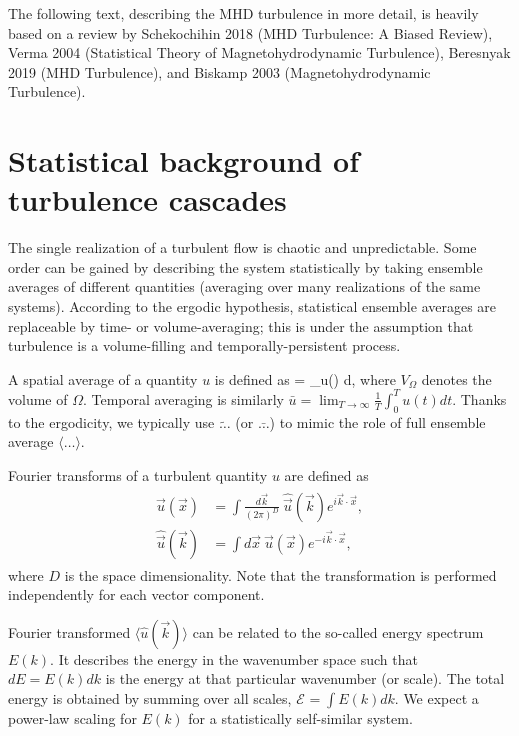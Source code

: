 \documentclass[usenatbib,twocolumn, twocolappendix]{aastex63}
\newcommand{\ene}[2]{\mathcal{E}_{#1}^{#2}} %
\begin{document}
The following text, describing the MHD turbulence in more detail, is heavily based on a review by Schekochihin 2018 (MHD Turbulence: A Biased Review), Verma 2004 (Statistical Theory of Magnetohydrodynamic Turbulence), Beresnyak 2019 (MHD Turbulence), and Biskamp 2003 (Magnetohydrodynamic Turbulence).




\section{Statistical background of turbulence cascades}\label{sect:turb}

The single realization of a turbulent flow is chaotic and unpredictable.
Some order can be gained by describing the system statistically by taking ensemble averages of different quantities (averaging over many realizations of the same systems).
According to the ergodic hypothesis, statistical ensemble averages are replaceable by time- or volume-averaging;
this is under the assumption that turbulence is a volume-filling and temporally-persistent process.

A spatial average of a quantity $u$ is defined as
\be
{} =  \int_\Omega u() d,
\ee
where $V_\Omega$ denotes the volume of $\Omega$.
Temporal averaging is similarly $\bar{u} = \lim_{T\rightarrow\infty} \frac{1}{T} \int_0^T u(t) dt$.
Thanks to the ergodicity, we typically use $\tilde{\ldots}$ (or $\bar{\ldots}$) to mimic the role of full ensemble average $\langle \ldots \rangle$.

Fourier transforms of a turbulent quantity $u$ are defined as
\begin{align}\begin{split}
            \vec{u}(\vec{x}) &= \int \frac{ d\vec{k} }{(2\pi)^D} ~ \hat{\vec{u}}(\vec{k}) e^{i \vec{k} \cdot \vec{x} }, \\
    \hat{ \vec{u}} (\vec{k}) &= \int d\vec{x}~ \vec{u}(\vec{x}) e^{-i \vec{k} \cdot \vec{x} },
\end{split}\end{align}
where $D$ is the space dimensionality.
Note that the transformation is performed independently for each vector component.

Fourier transformed $\langle \hat{u}(\vec{k}) \rangle$ can be related to the so-called energy spectrum $E(k)$.
It describes the energy in the wavenumber space such that $dE = E(k) dk$ is the energy at that particular wavenumber (or scale).
The total energy is obtained by summing over all scales, $\ene{}{} = \int E(k) dk$.
We expect a power-law scaling for $E(k)$ for a statistically self-similar system.
\end{document}

